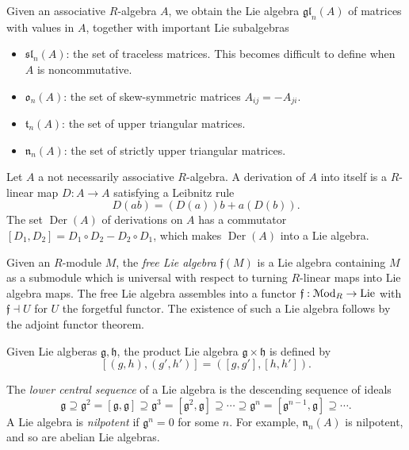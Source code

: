 \begin{example}\label{7.1.2}
Given an associative $R$-algebra $A$, we obtain the Lie algebra $\mathfrak{gl} _n(A)$ of matrices with values in $A$, together with important Lie subalgebras
\begin{itemize}
	\item $\mathfrak{sl} _n(A)$: the set of traceless matrices. This becomes difficult to define when $A$ is noncommutative.
	\item $\mathfrak{o}_n(A)$: the set of skew-symmetric matrices $A_{ij} =-A_{ji} $.
	\item $\mathfrak{t} _n(A)$: the set of upper triangular matrices.
	\item $\mathfrak{n} _n(A)$: the set of strictly upper triangular matrices.
\end{itemize}
\end{example}

\begin{example}\label{7.1.3}
Let $A$ a not necessarily associative $R$-algebra. A derivation of $A$ into itself is a $R$-linear map $D : A \to A$ satisfying a Leibnitz rule
\[
	D(ab)=(D(a))b + a(D(b))
.\]
The set $\operatorname{Der} (A)$ of derivations on $A$ has a commutator $[D_1,D_2]=D_1\circ D_2 - D_2\circ D_1$, which makes $\operatorname{Der} (A)$ into a Lie algebra.
\end{example}

\begin{construction}\label{7.1.4}
Given an $R$-module $M$, the \emph{free Lie algebra} $\mathfrak{f} (M)$ is a Lie algebra containing $M$ as a submodule which is universal with respect to turning $R$-linear maps into Lie algebra maps. The free Lie algebra assembles into a functor $\mathfrak{f} : \mathcal{M}\mathrm{od}_R\to\mathrm{Lie}$ with $\mathfrak{f} \dashv U$ for $U$ the forgetful functor. The existence of such a Lie algebra follows by the adjoint functor theorem.
\end{construction}

\begin{construction}\label{7.1.5}	
Given Lie algberas $\mathfrak{g} ,\mathfrak{h} $, the product Lie algebra $\mathfrak{g} \times \mathfrak{h} $ is defined by
\[
	[(g,h),(g',h')]=([g,g'],[h,h'])
.\]
\end{construction}

The \emph{lower central sequence} of a Lie algebra is the descending sequence of ideals
\[
	\mathfrak{g} \supseteq \mathfrak{g} ^2=[\mathfrak{g} ,\mathfrak{g} ]\supseteq \mathfrak{g} ^3=[\mathfrak{g} ^2,\mathfrak{g} ]\supseteq \cdots \supseteq \mathfrak{g} ^n=[\mathfrak{g} ^{n-1} ,\mathfrak{g} ]\supseteq\cdots 
.\]
A Lie algebra is \emph{nilpotent} if $\mathfrak{g} ^n=0$ for some $n$. For example, $\mathfrak{n} _n(A)$ is nilpotent, and so are abelian Lie algebras.

